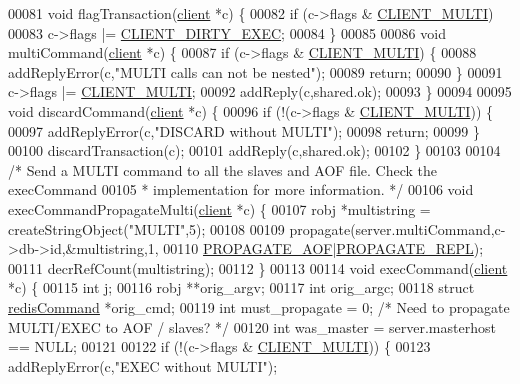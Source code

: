\begin{DoxyCode}
00081 \textcolor{keywordtype}{void} flagTransaction(\hyperlink{structclient}{client} *c) \{
00082     \textcolor{keywordflow}{if} (c->flags & \hyperlink{server_8h_a7f61f783f429419f8c593291a509b03a}{CLIENT\_MULTI})
00083         c->flags |= \hyperlink{server_8h_a7c203dc3aba692e212393d08530bdb97}{CLIENT\_DIRTY\_EXEC};
00084 \}
00085 
00086 \textcolor{keywordtype}{void} multiCommand(\hyperlink{structclient}{client} *c) \{
00087     \textcolor{keywordflow}{if} (c->flags & \hyperlink{server_8h_a7f61f783f429419f8c593291a509b03a}{CLIENT\_MULTI}) \{
00088         addReplyError(c,\textcolor{stringliteral}{"MULTI calls can not be nested"});
00089         \textcolor{keywordflow}{return};
00090     \}
00091     c->flags |= \hyperlink{server_8h_a7f61f783f429419f8c593291a509b03a}{CLIENT\_MULTI};
00092     addReply(c,shared.ok);
00093 \}
00094 
00095 \textcolor{keywordtype}{void} discardCommand(\hyperlink{structclient}{client} *c) \{
00096     \textcolor{keywordflow}{if} (!(c->flags & \hyperlink{server_8h_a7f61f783f429419f8c593291a509b03a}{CLIENT\_MULTI})) \{
00097         addReplyError(c,\textcolor{stringliteral}{"DISCARD without MULTI"});
00098         \textcolor{keywordflow}{return};
00099     \}
00100     discardTransaction(c);
00101     addReply(c,shared.ok);
00102 \}
00103 
00104 \textcolor{comment}{/* Send a MULTI command to all the slaves and AOF file. Check the execCommand}
00105 \textcolor{comment}{ * implementation for more information. */}
00106 \textcolor{keywordtype}{void} execCommandPropagateMulti(\hyperlink{structclient}{client} *c) \{
00107     robj *multistring = createStringObject(\textcolor{stringliteral}{"MULTI"},5);
00108 
00109     propagate(server.multiCommand,c->db->id,&multistring,1,
00110               \hyperlink{server_8h_a542fb79924ca427c866fd63632f60777}{PROPAGATE\_AOF}|\hyperlink{server_8h_a59c6e025b4ed85642a0472fc3e73e298}{PROPAGATE\_REPL});
00111     decrRefCount(multistring);
00112 \}
00113 
00114 \textcolor{keywordtype}{void} execCommand(\hyperlink{structclient}{client} *c) \{
00115     \textcolor{keywordtype}{int} j;
00116     robj **orig\_argv;
00117     \textcolor{keywordtype}{int} orig\_argc;
00118     \textcolor{keyword}{struct} \hyperlink{structredisCommand}{redisCommand} *orig\_cmd;
00119     \textcolor{keywordtype}{int} must\_propagate = 0; \textcolor{comment}{/* Need to propagate MULTI/EXEC to AOF / slaves? */}
00120     \textcolor{keywordtype}{int} was\_master = server.masterhost == NULL;
00121 
00122     \textcolor{keywordflow}{if} (!(c->flags & \hyperlink{server_8h_a7f61f783f429419f8c593291a509b03a}{CLIENT\_MULTI})) \{
00123         addReplyError(c,\textcolor{stringliteral}{"EXEC without MULTI"});

\end{DoxyCode}
